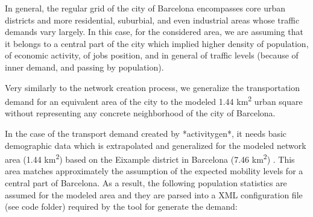 \documentclass[11pt]{article}
\begin{document}
In general, the regular grid of the city of Barcelona encompasses core urban districts and more residential, suburbial, and even industrial areas whose traffic demands vary largely. In this case, for the considered area, we are assuming that it belongs to a central part of the city which implied higher density of population, of economic activity, of jobs position, and in general of traffic levels (because of inner demand, and passing by population).

Very similarly to the network creation process, we generalize the transportation demand for an equivalent area of the city to the modeled 1.44 km\textsuperscript{2} urban square without representing any concrete neighborhood of the city of Barcelona.

In the case of the transport demand created by *activitygen*, it needs basic demographic data which is extrapolated and generalized for the modeled network area (1.44 km\textsuperscript{2}) based on the Eixample district in Barcelona (7.46 km\textsuperscript{2}) \citep{AjuntamentdeBarcelona2018}\citep{AreadeBarcelona.AutoritatdelTransportMetropolita2020}\citep{DepartamentdAnalisiOficinaMunicipaldeDades.AjuntamentdeBarcelona2020}. This area matches approximately the assumption of the expected mobility levels for a central part of Barcelona. As a result, the following population statistics are assumed for the modeled area and they are parsed into a XML configuration file (see code folder) required by the tool for generate the demand:

\begin{table}[htbp]
\centering
\caption{Population statistics for the modeled area used in ACTIVITYGEN}
\label{tab:pop-stats}
\end{table}
\end{document}
